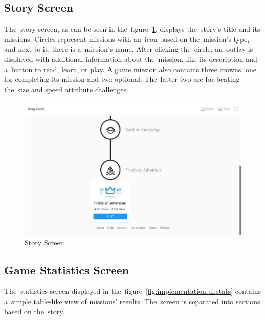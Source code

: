 \subsection{Story Screen}

The~story screen, as can be seen in the~figure~\ref{fig:implementation:ui:story}, displays the~story's title and its missions.
Circles represent missions with an~icon based on the~mission's type, and next to it, there is a~mission's name.
After clicking the~circle, an~outlay is displayed with additional information about the~mission, like its description and a~button to read, learn, or play.
A game mission also contains three crowns, one for completing its mission and two optional.
The~latter two are for beating the~size and speed attribute challenges.

\begin{figure}
    \centering
    \includegraphics[width=1\linewidth]{assets/implementation/ui/kingkarel_story_game_mission.jpeg}
    \caption{Story Screen}
    \label{fig:implementation:ui:story}
\end{figure}

\subsection{Game Statistics Screen}

The~statistics screen displayed in the~figure~\ref{fig:implementation:ui:stats} contains a~simple table-like view of missions' results.
The~screen is separated into sections based on the~story.

